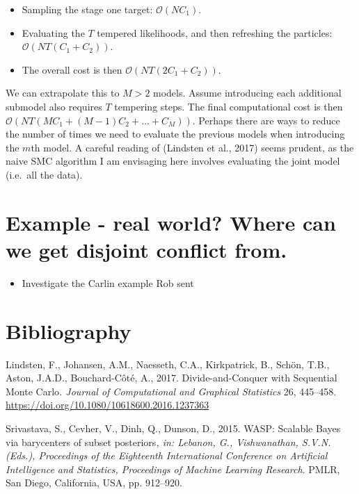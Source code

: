 \documentclass[10pt,a4paper,]{article}
\providecommand{\tightlist}{%
  \setlength{\itemsep}{0pt}\setlength{\parskip}{0pt}}
\newcommand{\Nx}{N}
\newcommand{\Nm}{M}
\newcommand{\modelindex}{m}
\begin{document}
\begin{itemize}
\tightlist
\item
  Sampling the stage one target: \(\mathcal{O}(\Nx C_{1})\).
\item
  Evaluating the \(T\) tempered likelihoods, and then refreshing the
  particles: \(\mathcal{O}(\Nx T (C_{1} + C_{2}))\). 
\item
  The overall cost is then \(\mathcal{O}(\Nx T (2 C_{1} + C_{2}))\).
\end{itemize}

We can extrapolate this to \(\Nm > 2\) models. Assume introducing each
additional submodel also requires \(T\) tempering steps. The final
computational cost is then
\(\mathcal{O}(\Nx T (\Nm C_{1} + (\Nm - 1) C_{2} + \ldots + C_{\Nm}))\).
Perhaps there are ways to reduce the number of times we need to evaluate
the previous models when introducing the \(\modelindex\)th model. A
careful reading of (Lindsten et al., 2017) seems prudent, as the naive
SMC algorithm I am envisaging here involves evaluating the joint model
(i.e.~all the data).

\section{Example - real world? Where can we get disjoint conflict
from.}\label{example---real-world-where-can-we-get-disjoint-conflict-from.}

\begin{itemize}
\tightlist
\item
  Investigate the Carlin example Rob sent
\end{itemize}

\newpage

\section*{Bibliography}\label{bibliography}

\hypertarget{refs}{}
\hypertarget{ref-lindsten:etal:17}{}
Lindsten, F., Johansen, A.M., Naesseth, C.A., Kirkpatrick, B., Schön,
T.B., Aston, J.A.D., Bouchard-Côté, A., 2017. Divide-and-Conquer with
Sequential Monte Carlo\emph{. Journal of Computational and Graphical
Statistics} 26, 445--458.
\url{https://doi.org/10.1080/10618600.2016.1237363}

\hypertarget{ref-srivastava:etal:15}{}
Srivastava, S., Cevher, V., Dinh, Q., Dunson, D., 2015. WASP: Scalable
Bayes via barycenters of subset posteriors\emph{, in: Lebanon, G.,
Vishwanathan, S.V.N. (Eds.), Proceedings of the Eighteenth International
Conference on Artificial Intelligence and Statistics, Proceedings of
Machine Learning Research}. PMLR, San Diego, California, USA, pp.
912--920.
\end{document}
